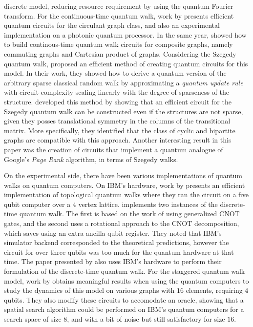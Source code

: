 \documentclass[../../dissertation.tex]{subfiles}
\begin{document}
discrete model, reducing resource requirement by using the quantum Fourier
transform. 
For the continuous-time quantum walk, work by \cite{qiang2016} presents
efficient quantum circuits for the circulant graph class, and also an
experimental implementation on a photonic quantum processor. In the same year,
\cite{loke2017b} showed how to build continous-time quantum walk circuits for
composite graphs, namely commuting graphs and Cartesian product of graphs.
Considering the Szegedy quantum walk, \cite{chiang2009} proposed an efficient
method of creating quantum circuits for this model.  In their work, they showed
how to derive a quantum version of the arbitrary sparse classical random walk
by approximating a \textit{quantum update rule} with circuit complexity scaling
linearly with the degree of sparseness of the structure. \cite{loke2017a}
developed this method by showing that an efficient circuit for the Szegedy
quantum walk can be constructed even if the structures are not sparse, given
they posses translational symmetry in the columns of the transitional matrix.
More specifically, they identified that the class of cyclic and bipartite
graphs are compatible with this approach.  Another interesting result in this
paper was the creation of circuits that implement a quantum analogue of
Google's \textit{Page Rank} algorithm, in terms of Szegedy walks. \par
On the experimental side, there have been various implementations of
quantum walks on quantum computers. On IBM's hardware, work by \cite{balu2017}
presents an efficient implementation of topological quantum walks where they
ran the circuit on a five qubit computer over a $4$ vertex lattice.
\cite{Georgopoulos2019} implements two instances of the discrete-time quantum
walk. The first is based on the work of \cite{douglaswang07} using generalized
CNOT gates, and the second uses a rotational approach to the CNOT
decomposition, which saves using an extra ancilla qubit register. They noted
that IBM's simulator backend corresponded to the theoretical predictions,
however the circuit for over three qubits was too much for the quantum hardware
at that time. The paper presented by \cite{shakeel2020} also uses IBM's
hardware to perform their formulation of the discrete-time quantum walk. For
the staggered quantum walk model, work by \cite{acasiete2020} obtains
meaningful results when using the quantum computers to study the dynamics of
this model on various graphs with $16$ elements, requiring $4$ qubits. They
also modify these circuits to accomodate an oracle, showing that a spatial
search algorithm could be performed on IBM's quantum computers for a search
space of size $8$, and with a bit of noise but still satisfactory for size
$16$.
\end{document}
